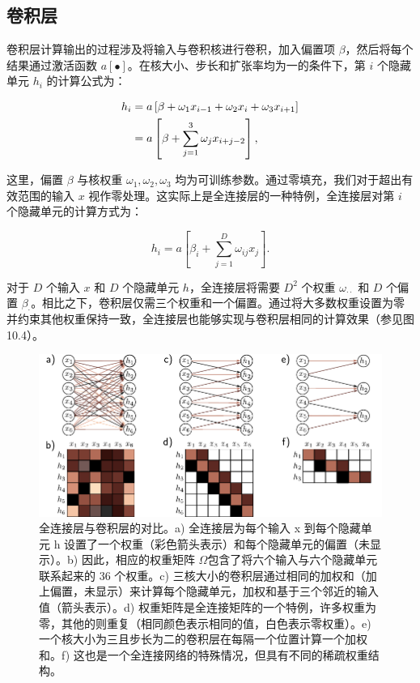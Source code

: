 \documentclass[lang=cn,newtx,10pt,scheme=chinese]{elegantbook}
\begin{document}
\subsection{卷积层}
卷积层计算输出的过程涉及将输入与卷积核进行卷积，加入偏置项 \(\beta\)，然后将每个结果通过激活函数 \(a[•]\)。在核大小、步长和扩张率均为一的条件下，第 \(i\) 个隐藏单元 \(h_i\) 的计算公式为：


\begin{align}
h_i &= a \left[ \beta + \omega_1 x_{i-1} + \omega_2 x_i + \omega_3 x_{i+1} \right] \notag \\
&= a \left[ \beta + \sum_{j=1}^{3} \omega_j x_{i+j-2} \right], 
\end{align} 

这里，偏置 \(\beta\) 与核权重 \(\omega_1, \omega_2, \omega_3\) 均为可训练参数。通过零填充，我们对于超出有效范围的输入 \(x\) 视作零处理。这实际上是全连接层的一种特例，全连接层对第 \(i\) 个隐藏单元的计算方式为：

\begin{equation}
h_i = a \left[ \beta_i + \sum_{j=1}^{D} \omega_{ij} x_j \right]. 
\end{equation}

对于 \(D\) 个输入 \(x\) 和 \(D\) 个隐藏单元 \(h\)，全连接层将需要 \(D^2\) 个权重 \(\omega_{\cdot \cdot}\) 和 \(D\) 个偏置 \(\beta_{\cdot}\)。相比之下，卷积层仅需三个权重和一个偏置。通过将大多数权重设置为零并约束其他权重保持一致，全连接层也能够实现与卷积层相同的计算效果（参见图 10.4）。


\begin{figure}[ht!]
\centering
\includegraphics[width=0.7\linewidth]{PDFFigures/UDLChap10PDF/Conv2a.pdf}
\caption{全连接层与卷积层的对比。a) 全连接层为每个输入 x 到每个隐藏单元 h 设置了一个权重（彩色箭头表示）和每个隐藏单元的偏置（未显示）。b) 因此，相应的权重矩阵 \(\Omega\)包含了将六个输入与六个隐藏单元联系起来的 36 个权重。c) 三核大小的卷积层通过相同的加权和（加上偏置，未显示）来计算每个隐藏单元，加权和基于三个邻近的输入值（箭头表示）。d) 权重矩阵是全连接矩阵的一个特例，许多权重为零，其他的则重复（相同颜色表示相同的值，白色表示零权重）。e) 一个核大小为三且步长为二的卷积层在每隔一个位置计算一个加权和。f) 这也是一个全连接网络的特殊情况，但具有不同的稀疏权重结构。}
\end{figure}
\end{document}
